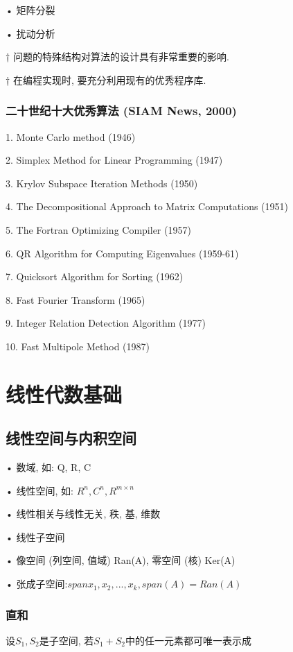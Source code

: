 \documentclass[12pt,a4paper]{article}
\begin{document}
	• 矩阵分裂
	
	• 扰动分析

\begin{framed}
	† 问题的特殊结构对算法的设计具有非常重要的影响.
\end{framed}

\begin{framed}
	† 在编程实现时, 要充分利用现有的优秀程序库.
\end{framed}

\subsubsection*{二十世纪十大优秀算法 (SIAM News, 2000)}
1. Monte Carlo method (1946)

2. Simplex Method for Linear Programming (1947)

3. Krylov Subspace Iteration Methods (1950)

4. The Decompositional Approach to Matrix Computations (1951)

5. The Fortran Optimizing Compiler (1957)

6. QR Algorithm for Computing Eigenvalues (1959-61)

7. Quicksort Algorithm for Sorting (1962)

8. Fast Fourier Transform (1965)

9. Integer Relation Detection Algorithm (1977)

10. Fast Multipole Method (1987)

\newpage
\section{线性代数基础}
\subsection{线性空间与内积空间}
• 数域, 如: Q, R, C

• 线性空间, 如: $R^n,C^n,R^{m×n}$

• 线性相关与线性无关, 秩, 基, 维数

• 线性子空间

• 像空间 (列空间, 值域) Ran(A), 零空间 (核) Ker(A)

• 张成子空间:$span{x_1, x_2, . . . , x_k}, span(A) = Ran(A)$

\subsubsection{直和}
设$S_1, S_2$是子空间, 若$S_1 + S_2$中的任一元素都可唯一表示成
\end{document}

